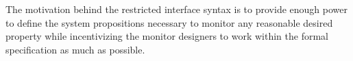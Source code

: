 
The motivation behind the restricted interface syntax is to provide enough power to define the system propositions necessary to monitor any reasonable desired property while incentivizing the monitor designers to work within the formal specification as much as possible.
%
%
%
